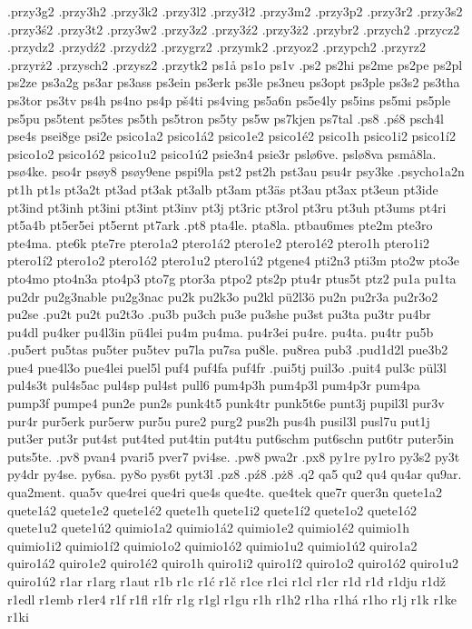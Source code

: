 {{.przy3g2
.przy3h2
.przy3k2
.przy3l2
.przy3ł2
.przy3m2
.przy3p2
.przy3r2
.przy3s2
.przy3ś2
.przy3t2
.przy3w2
.przy3z2
.przy3ź2
.przy3ż2
.przybr2
.przych2
.przycz2
.przydz2
.przydź2
.przydż2
.przygrz2
.przymk2
.przyoz2
.przypch2
.przyrz2
.przyrż2
.przysch2
.przysz2
.przytk2
ps1å
ps1o
ps1v
.ps2
ps2hi
ps2me
ps2pe
ps2pl
ps2ze
ps3a2g
ps3ar
ps3ass
ps3ein
ps3erk
ps3le
ps3neu
ps3opt
ps3ple
ps3s2
ps3tha
ps3tor
ps3tv
ps4h
ps4no
ps4p
pš4ti
ps4ving
ps5a6n
ps5e4ly
ps5ins
ps5mi
ps5ple
ps5pu
ps5tent
ps5tes
ps5th
ps5tron
ps5ty
ps5w
ps7kjen
ps7tal
.ps8
.pś8
psch4l
pse4s
psei8ge
psi2e
psico1a2
psico1á2
psico1e2
psico1é2
psico1h
psico1i2
psico1í2
psico1o2
psico1ó2
psico1u2
psico1ú2
psie3n4
psie3r
pslø6ve.
pslø8va
psmå8la.
psø4ke.
pso4r
psøy8
psøy9ene
pspi9la
pst2
pst2h
pst3au
psu4r
psy3ke
.psycho1a2n
pt1h
pt1s
pt3a2t
pt3ad
pt3ak
pt3alb
pt3am
pt3äs
pt3au
pt3ax
pt3eun
pt3ide
pt3ind
pt3inh
pt3ini
pt3int
pt3inv
pt3j
pt3ric
pt3rol
pt3ru
pt3uh
pt3ums
pt4ri
pt5a4b
pt5er5ei
pt5ernt
pt7ark
.pt8
pta4le.
pta8la.
ptbau6mes
pte2m
pte3ro
pte4ma.
pte6k
pte7re
ptero1a2
ptero1á2
ptero1e2
ptero1é2
ptero1h
ptero1i2
ptero1í2
ptero1o2
ptero1ó2
ptero1u2
ptero1ú2
ptgene4
pti2n3
pti3m
pto2w
pto3e
pto4mo
pto4n3a
pto4p3
pto7g
ptor3a
ptpo2
pts2p
ptu4r
ptus5t
ptz2
pu1a
pu1ta
pu2dr
pu2g3nable
pu2g3nac
pu2k
pu2k3o
pu2kl
pü2l3ö
pu2n
pu2r3a
pu2r3o2
pu2se
.pu2t
pu2t
pu2t3o
.pu3b
pu3ch
pu3e
pu3she
pu3st
pu3ta
pu3tr
pu4br
pu4dl
pu4ker
pu4l3in
pü4lei
pu4m
pu4ma.
pu4r3ei
pu4re.
pu4ta.
pu4tr
pu5b
.pu5ert
pu5tas
pu5ter
pu5tev
pu7la
pu7sa
pu8le.
pu8rea
pub3
.pud1d2l
pue3b2
pue4
pue4l3o
pue4lei
puel5l
puf4
puf4fa
puf4fr
.pui5tj
puil3o
.puit4
pul3c
pül3l
pul4s3t
pul4s5ac
pul4sp
pul4st
pull6
pum4p3h
pum4p3l
pum4p3r
pum4pa
pump3f
pumpe4
pun2e
pun2s
punk4t5
punk4tr
punk5t6e
punt3j
pupil3l
pur3v
pur4r
pur5erk
pur5erw
pur5u
pure2
purg2
pus2h
pus4h
pusil3l
pusl7u
put1j
put3er
put3r
put4st
put4ted
put4tin
put4tu
put6schm
put6schn
put6tr
puter5in
puts5te.
.pv8
pvan4
pvari5
pver7
pvi4se.
.pw8
pwa2r
.px8
py1re
py1ro
py3s2
py3t
py4dr
py4se.
py6sa.
py8o
pys6t
pyt3l
.pz8
.pź8
.pż8
.q2
qa5
qu2
qu4
qu4ar
qu9ar.
qua2ment.
qua5v
que4rei
que4ri
que4s
que4te.
que4tek
que7r
quer3n
quete1a2
quete1á2
quete1e2
quete1é2
quete1h
quete1i2
quete1í2
quete1o2
quete1ó2
quete1u2
quete1ú2
quimio1a2
quimio1á2
quimio1e2
quimio1é2
quimio1h
quimio1i2
quimio1í2
quimio1o2
quimio1ó2
quimio1u2
quimio1ú2
quiro1a2
quiro1á2
quiro1e2
quiro1é2
quiro1h
quiro1i2
quiro1í2
quiro1o2
quiro1ó2
quiro1u2
quiro1ú2
r1ar
r1arg
r1aut
r1b
r1c
r1ć
r1č
r1ce
r1ci
r1cl
r1cr
r1d
r1đ
r1dju
r1dž
r1edl
r1emb
r1er4
r1f
r1fl
r1fr
r1g
r1gl
r1gu
r1h
r1h2
r1ha
r1há
r1ho
r1j
r1k
r1ke
r1ki
}}
